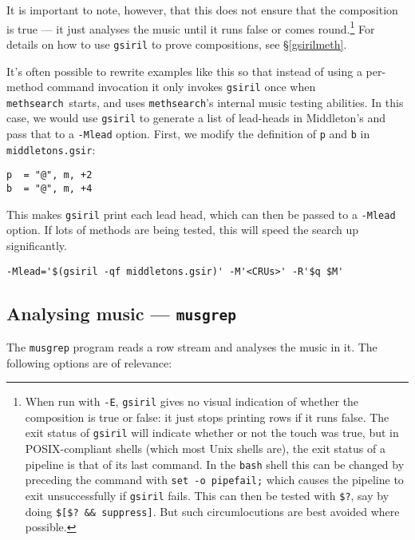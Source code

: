 \documentclass[a4paper,11pt,oneside]{book}
\makeatletter
\newcommand{\ttcmdidx}[1]{\texttt{#1}\index{#1@{\texttt{#1}}}}
\def\methsearch{\texttt{meth\-search}}
\newcommand{\sref}[1]{\hyperref[#1]{\S\ref{#1}}}
\makeatother
\begin{document}
It is important to note, however, that this does not ensure that the 
composition is true --- it just analyses the music until it runs false or 
comes round.\footnote{When run with \verb+-E+, \texttt{gsiril} gives no visual
indication of whether the composition is true or false: it just stops printing
rows if it runs false.  The exit status of \texttt{gsiril} will indicate 
whether or not the touch was true, but in POSIX-compliant shells (which most
Unix shells are), the exit status of a pipeline is
that of its last command.  In the \verb+bash+ shell 
this can be changed by preceding the command with \verb+set -o pipefail;+ which
causes the pipeline to exit unsuccessfully if \texttt{gsiril} fails.  This
can then be tested with \verb+$?+, say by doing \verb+$[$? && suppress]+.%
But such circumlocutions are best avoided where possible.}
For details on how to use \texttt{gsiril} to prove compositions, see 
\sref{gsirilmeth}.

It's often possible to rewrite examples like this so that instead of using
a per-method command invocation it only invokes \texttt{gsiril} once when 
\methsearch\ starts, and uses \methsearch's internal music testing abilities.
In this case, we would use \texttt{gsiril} to generate a list of lead-heads
in Middleton's and pass that to a \verb+-Mlead+ option.  First, we modify
the definition of \verb+p+ and \verb+b+ in \texttt{middletons.gsir}:
\begin{Verbatim}
p  = "@", m, +2
b  = "@", m, +4
\end{Verbatim}
This makes \texttt{gsiril} print each lead head, which can then be passed
to a \verb+-Mlead+ option.  If lots of methods are being tested, this will
speed the search up significantly.
\begin{Verbatim}[commandchars=@~~]
-Mlead='$(gsiril -qf middletons.gsir)' -M'<CRUs>' -R'$q $M'
\end{Verbatim}

\subsection{Analysing music — \texttt{musgrep}}\label{musgrep}

The \ttcmdidx{musgrep} program reads a row stream and analyses the
music in it.  The following options are of relevance:
\end{document}
